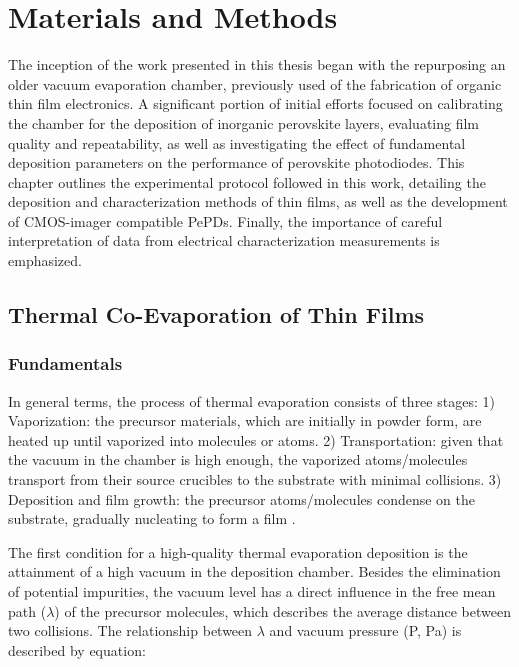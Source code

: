 \chapter{Materials and Methods}\label{ch:material_properties}

The inception of the work presented in this thesis began with the repurposing an older vacuum evaporation chamber, previously used of the fabrication of organic thin film electronics. A significant portion of initial efforts focused on calibrating the chamber for the deposition of inorganic perovskite layers, evaluating film quality and repeatability, as well as investigating the effect of fundamental deposition parameters on the performance of perovskite photodiodes. This chapter outlines the experimental protocol followed in this work, detailing the deposition and characterization methods of  thin films, as well as the development of CMOS-imager compatible PePDs. Finally, the importance of careful interpretation of data from electrical characterization measurements is emphasized. 

\section{Thermal Co-Evaporation of  Thin Films}

\subsection{Fundamentals}

In general terms, the process of thermal evaporation consists of three stages: 1) Vaporization: the precursor materials, which are initially in powder form, are heated up until vaporized into molecules or atoms. 2) Transportation: given that the vacuum in the chamber is high enough, the vaporized atoms/molecules transport from their source crucibles to the substrate with minimal collisions. 3) Deposition and film growth: the precursor atoms/molecules condense on the substrate, gradually nucleating to form a film \cite{Du2022ThermalOutlook}. 

The first condition for a high-quality thermal evaporation deposition is the attainment of a high vacuum in the deposition chamber. Besides the elimination of potential impurities, the vacuum level has a direct influence in the free mean path ($\lambda$) of the precursor molecules, which describes the average distance between two collisions. The relationship between $\lambda$ and vacuum pressure (P, Pa) is described by equation:

